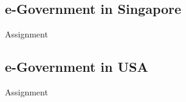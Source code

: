 %
%
%

\subsection{e-Government in  Singapore}
Assignment

\subsection{e-Government in  USA}
Assignment



\newpage\thispagestyle{empty}


